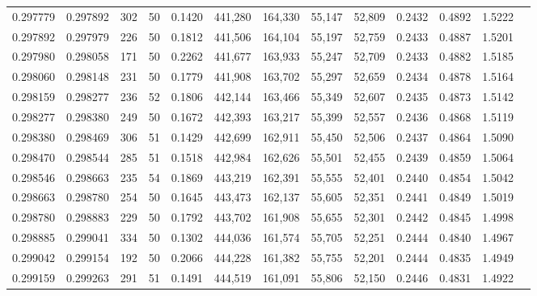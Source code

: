 \begin{tabular}{rrrrrrrrrrrrr}
0.297779 & 0.297892 &   302 &  50 &                                     0.1420 & 441,280 & 164,330 &  55,147 &  52,809 & 0.2432 & 0.4892 & 1.5222 \\
0.297892 & 0.297979 &   226 &  50 &                                     0.1812 & 441,506 & 164,104 &  55,197 &  52,759 & 0.2433 & 0.4887 & 1.5201 \\
0.297980 & 0.298058 &   171 &  50 &                                     0.2262 & 441,677 & 163,933 &  55,247 &  52,709 & 0.2433 & 0.4882 & 1.5185 \\
0.298060 & 0.298148 &   231 &  50 &                                     0.1779 & 441,908 & 163,702 &  55,297 &  52,659 & 0.2434 & 0.4878 & 1.5164 \\
0.298159 & 0.298277 &   236 &  52 &                                     0.1806 & 442,144 & 163,466 &  55,349 &  52,607 & 0.2435 & 0.4873 & 1.5142 \\
0.298277 & 0.298380 &   249 &  50 &                                     0.1672 & 442,393 & 163,217 &  55,399 &  52,557 & 0.2436 & 0.4868 & 1.5119 \\
0.298380 & 0.298469 &   306 &  51 &                                     0.1429 & 442,699 & 162,911 &  55,450 &  52,506 & 0.2437 & 0.4864 & 1.5090 \\
0.298470 & 0.298544 &   285 &  51 &                                     0.1518 & 442,984 & 162,626 &  55,501 &  52,455 & 0.2439 & 0.4859 & 1.5064 \\
0.298546 & 0.298663 &   235 &  54 &                                     0.1869 & 443,219 & 162,391 &  55,555 &  52,401 & 0.2440 & 0.4854 & 1.5042 \\
0.298663 & 0.298780 &   254 &  50 &                                     0.1645 & 443,473 & 162,137 &  55,605 &  52,351 & 0.2441 & 0.4849 & 1.5019 \\
0.298780 & 0.298883 &   229 &  50 &                                     0.1792 & 443,702 & 161,908 &  55,655 &  52,301 & 0.2442 & 0.4845 & 1.4998 \\
0.298885 & 0.299041 &   334 &  50 &                                     0.1302 & 444,036 & 161,574 &  55,705 &  52,251 & 0.2444 & 0.4840 & 1.4967 \\
0.299042 & 0.299154 &   192 &  50 &                                     0.2066 & 444,228 & 161,382 &  55,755 &  52,201 & 0.2444 & 0.4835 & 1.4949 \\
0.299159 & 0.299263 &   291 &  51 &                                     0.1491 & 444,519 & 161,091 &  55,806 &  52,150 & 0.2446 & 0.4831 & 1.4922 \\

\end{tabular}
